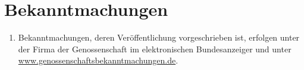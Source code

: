 \documentclass[a4paper, 12pt]{scrartcl}
\begin{document}
\section{Bekanntmachungen}
\begin{enumerate}
  \item Bekanntmachungen, deren Veröffentlichung vorgeschrieben ist, erfolgen unter der Firma der Genossenschaft im elektronischen Bundesanzeiger und unter \url{www.genossenschaftsbekanntmachungen.de}.
\end{enumerate}


\end{document}
